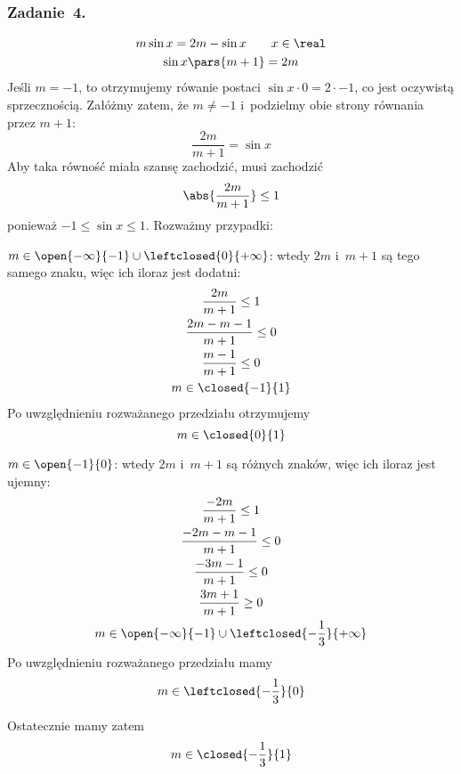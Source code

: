 \subsubsection*{Zadanie~4.}
\begin{gather*}
    m\sin x = 2m - \sin x \qquad x \in \real\\
    \sin x\pars{m + 1} = 2m
\end{gather*}
Jeśli \(m = -1\), to otrzymujemy rówanie postaci \(\sin x \cdot 0 = 2 \cdot -1\), co jest oczywistą sprzecznością. Załóżmy zatem, że \(m \neq -1\) i~podzielmy obie strony równania przez \(m + 1\):
\begin{equation*}
    \frac{2m}{m + 1} = \sin x
\end{equation*}
Aby taka równość miała szansę zachodzić, musi zachodzić
\begin{equation*}
    \abs{\frac{2m}{m + 1}} \leq 1
\end{equation*}
ponieważ \(-1 \leq \sin x \leq 1\). Rozważmy przypadki:
\begin{proofcases}
    \item \(m \in \open{-\infty}{-1} \cup \leftclosed{0}{+\infty}\): wtedy \(2m\) i~\(m + 1\) są tego samego znaku, więc ich iloraz jest dodatni:
        \begin{gather*}
            \frac{2m}{m + 1} \leq 1\\
            \frac{2m - m - 1}{m + 1} \leq 0\\
            \frac{m - 1}{m + 1} \leq 0\\
            m \in \closed{-1}{1}
        \end{gather*}
        Po uwzględnieniu rozważanego przedziału otrzymujemy
        \begin{equation*}
            m \in \closed{0}{1}
        \end{equation*}
    \item \(m \in \open{-1}{0}\): wtedy \(2m\) i~\(m + 1\) są różnych znaków, więc ich iloraz jest ujemny:
        \begin{gather*}
            \frac{-2m}{m + 1} \leq 1\\
            \frac{-2m - m - 1}{m + 1} \leq 0\\
            \frac{-3m - 1}{m + 1} \leq 0\\
            \frac{3m + 1}{m + 1} \geq 0\\
            m \in \open{-\infty}{-1} \cup \leftclosed{-\frac{1}{3}}{+\infty}
        \end{gather*}
        Po uwzględnieniu rozważanego przedziału mamy
        \begin{equation*}
            m \in \leftclosed{-\frac{1}{3}}{0}
        \end{equation*}
\end{proofcases}
Ostatecznie mamy zatem
\begin{equation*}
    m \in \closed{-\frac{1}{3}}{1}
\end{equation*}
